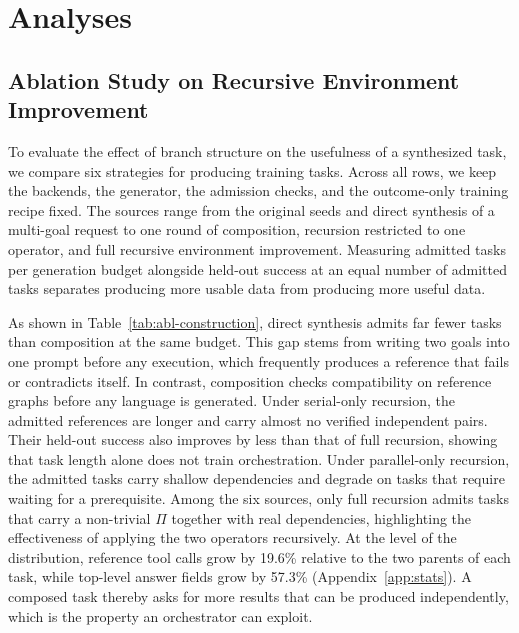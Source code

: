 \section{Analyses}
\label{sec:analysis}

\subsection{Ablation Study on Recursive Environment Improvement}
\label{sec:abl-construction}

To evaluate the effect of branch structure on the usefulness of a synthesized task, we compare six strategies for producing training tasks.
Across all rows, we keep the backends, the generator, the admission checks, and the outcome-only training recipe fixed.
The sources range from the original seeds and direct synthesis of a multi-goal request to one round of composition, recursion restricted to one operator, and full recursive environment improvement.
Measuring admitted tasks per generation budget alongside held-out success at an equal number of admitted tasks separates producing more usable data from producing more useful data.



As shown in Table~\ref{tab:abl-construction}, direct synthesis admits far fewer tasks than composition at the same budget.
This gap stems from writing two goals into one prompt before any execution, which frequently produces a reference that fails or contradicts itself.
In contrast, composition checks compatibility on reference graphs before any language is generated.
Under serial-only recursion, the admitted references are longer and carry almost no verified independent pairs.
Their held-out success also improves by less than that of full recursion, showing that task length alone does not train orchestration.
Under parallel-only recursion, the admitted tasks carry shallow dependencies and degrade on tasks that require waiting for a prerequisite.
Among the six sources, only full recursion admits tasks that carry a non-trivial $\Pi$ together with real dependencies, highlighting the effectiveness of applying the two operators recursively.
At the level of the distribution, reference tool calls grow by 19.6\% relative to the two parents of each task, while top-level answer fields grow by 57.3\% (Appendix~\ref{app:stats}).
A composed task thereby asks for more results that can be produced independently, which is the property an orchestrator can exploit.

